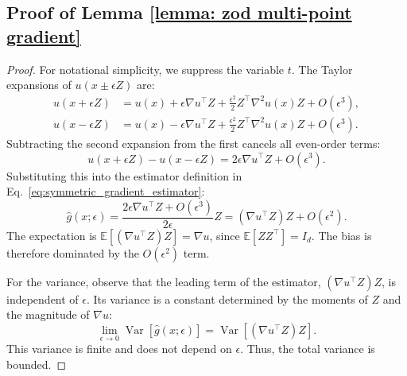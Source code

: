 \documentclass[twoside,11pt]{article}
\newcommand{\E}{\mathbb{E}}
\newcommand{\1}{\mathbf{1}}
\DeclareMathOperator{\Var}{Var}
\numberwithin{equation}{section}
\begin{document}
\subsection{Proof of Lemma \ref{lemma: zod multi-point gradient}}
\begin{proof}
For notational simplicity, we suppress the variable $t$. The Taylor expansions of $u(x \pm \epsilon Z)$ are:
\begin{align*}
u(x+\epsilon Z) &= u(x) + \epsilon \nabla u^\top Z + \frac{\epsilon^2}{2} Z^\top \nabla^2 u(x) Z + O(\epsilon^3), \\
u(x-\epsilon Z) &= u(x) - \epsilon \nabla u^\top Z + \frac{\epsilon^2}{2} Z^\top \nabla^2 u(x) Z + O(\epsilon^3).
\end{align*}
Subtracting the second expansion from the first cancels all even-order terms:
\[ u(x+\epsilon Z) - u(x-\epsilon Z) = 2\epsilon \nabla u^\top Z + O(\epsilon^3). \]
Substituting this into the estimator definition in Eq.~\eqref{eq:symmetric_gradient_estimator}:
\[ \hat{g}(x; \epsilon) = \frac{2\epsilon \nabla u^\top Z + O(\epsilon^3)}{2\epsilon} Z = (\nabla u^\top Z)Z + O(\epsilon^2). \]
The expectation is $\E[(\nabla u^\top Z)Z] = \nabla u$, since $\E[ZZ^\top] = I_d$. The bias is therefore dominated by the $O(\epsilon^2)$ term.

For the variance, observe that the leading term of the estimator, $(\nabla u^\top Z)Z$, is independent of $\epsilon$. Its variance is a constant determined by the moments of $Z$ and the magnitude of $\nabla u$:
\[ \lim_{\epsilon \to 0} \Var[\hat{g}(x; \epsilon)] = \Var[(\nabla u^\top Z)Z]. \]
This variance is finite and does not depend on $\epsilon$. Thus, the total variance is bounded.
\end{proof}
\end{document}
